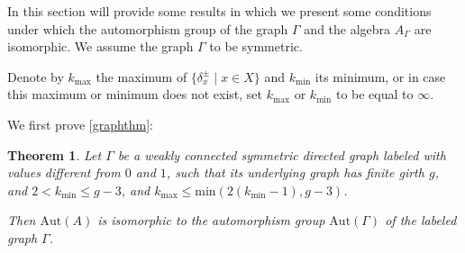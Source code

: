\documentclass[oneside,a4paper]{amsart} %
\newtheorem{theorem}[proposition]{Theorem}
\theoremstyle{definition}
\begin{document}
In this section will provide some results in which we present some conditions under which the automorphism group of the graph $\Gamma$ and 
the algebra $A_\Gamma$ are isomorphic. We assume the graph $\Gamma$ to be symmetric.

Denote by $k_{\mathrm{max}}$ the maximum of $\{\delta^\pm_x\mid x\in X\}$ and $k_{\mathrm{min}}$ its minimum, or in case this maximum or minimum does not exist, set $k_{\mathrm{max}}$ or $k_\mathrm{min}$ to be equal to $\infty$.

We first prove \cref{graphthm}:

\begin{theorem}\label{autgroupthm}
Let $\Gamma$ be a weakly connected symmetric directed graph labeled with values different from $0$ and $1$, such that its underlying graph has  finite girth $g$,
and $2<k_\mathrm{min}\leq g-3$, 
and $k_\mathrm{max}\leq\mathrm{min}(2(k_\mathrm{min}-1),g-3)$.

Then $\mathrm{Aut}(A)$ is isomorphic to
the automorphism group $\mathrm{Aut}(\Gamma)$ of the labeled graph $\Gamma$.
\end{theorem}
\end{document}

